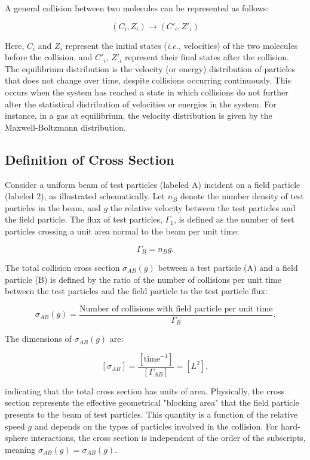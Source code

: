 \documentclass{article}
\begin{document}
A general collision between two molecules can be represented as follows:

\[
(C_i, Z_i) \longrightarrow (C'_i, Z'_i)
\]

Here, \( C_i \) and \( Z_i \) represent the initial states (\emph{i.e.}, velocities) of the two molecules before the collision, and \( C'_i \), \( Z'_i \) represent their final states after the collision. The equilibrium distribution is the velocity (or energy) distribution of particles that does not change over time, despite collisions occurring continuously. This occurs when the system has reached a state in which collisions do not further alter the statistical distribution of velocities or energies in the system. For instance, in a gas at equilibrium, the velocity distribution is given by the Maxwell-Boltzmann distribution.

\subsection{Definition of Cross Section}

Consider a uniform beam of test particles (labeled A) incident on a field particle (labeled 2), as illustrated schematically. Let \( n_B \) denote the number density of test particles in the beam, and \( g \) the relative velocity between the test particles and the field particle. The flux of test particles, \( \Gamma_1 \), is defined as the number of test particles crossing a unit area normal to the beam per unit time:

\[
\Gamma_B = n_B g.
\]

The total collision cross section \( \sigma_{AB}(g) \) between a test particle (A) and a field particle (B) is defined by the ratio of the number of collisions per unit time between the test particles and the field particle to the test particle flux:

\[
\sigma_{AB}(g) = \frac{\text{Number of collisions with field particle per unit time}}{\Gamma_B}.
\]

The dimensions of \( \sigma_{AB}(g) \) are:

\[
[\sigma_{AB}] = \frac{[\text{time}^{-1}]}{[\Gamma_{AB}]} = [L^2],
\]

indicating that the total cross section has units of area. Physically, the cross section represents the effective geometrical "blocking area" that the field particle presents to the beam of test particles. This quantity is a function of the relative speed \( g \) and depends on the types of particles involved in the collision. For hard-sphere interactions, the cross section is independent of the order of the subscripts, meaning \( \sigma_{AB}(g) = \sigma_{AB}(g) \).\\
\end{document}

